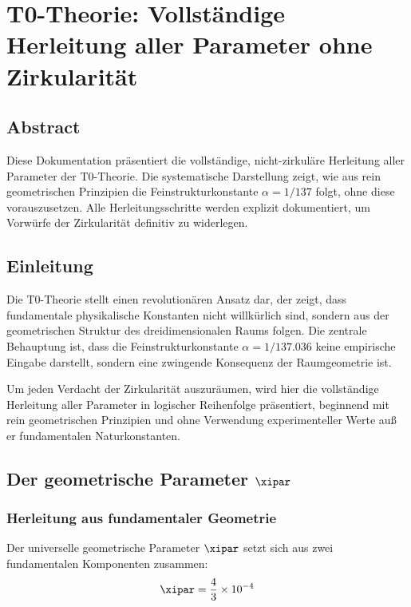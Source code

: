 \chapter{T0-Theorie: Vollständige Herleitung aller Parameter ohne Zirkularität}


	
\section*{Abstract}
		Diese Dokumentation präsentiert die vollständige, nicht-zirkuläre Herleitung aller Parameter der T0-Theorie. Die systematische Darstellung zeigt, wie aus rein geometrischen Prinzipien die Feinstrukturkonstante $\alpha = 1/137$ folgt, ohne diese vorauszusetzen. Alle Herleitungsschritte werden explizit dokumentiert, um Vorwürfe der Zirkularität definitiv zu widerlegen.

	
	\section{Einleitung}
	
	Die T0-Theorie stellt einen revolutionären Ansatz dar, der zeigt, dass fundamentale physikalische Konstanten nicht willkürlich sind, sondern aus der geometrischen Struktur des dreidimensionalen Raums folgen. Die zentrale Behauptung ist, dass die Feinstrukturkonstante $\alpha = 1/137.036$ keine empirische Eingabe darstellt, sondern eine zwingende Konsequenz der Raumgeometrie ist.
	
	Um jeden Verdacht der Zirkularität auszuräumen, wird hier die vollständige Herleitung aller Parameter in logischer Reihenfolge präsentiert, beginnend mit rein geometrischen Prinzipien und ohne Verwendung experimenteller Werte auß er fundamentalen Naturkonstanten.
\section{Der geometrische Parameter $\xipar$}

\subsection{Herleitung aus fundamentaler Geometrie}

Der universelle geometrische Parameter $\xipar$ setzt sich aus zwei fundamentalen Komponenten zusammen:
\begin{equation}
	\xipar = \frac{4}{3} \times 10^{-4}
\end{equation}

